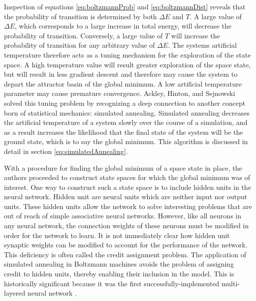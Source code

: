 \documentclass[11pt]{afthesis}
\begin{document}
	Inspection of equations \ref{eq:boltzmannProb} and \ref{eq:boltzmannDist} reveals that the probability of transition is determined by both \begin{math}\Delta E\end{math} and \begin{math}T\end{math}. A large value of \begin{math}\Delta E\end{math}, which corresponds to a large increase in total energy, will decrease the probability of transition. Conversely, a large value of \begin{math}T\end{math} will increase the probability of transition for any arbitrary value of \begin{math}\Delta E\end{math}. The systems artificial temperature therefore acts as a tuning mechanism for the exploration of the state space. A high temperature value will result greater exploration of the space state, but will result in less gradient descent and therefore may cause the system to depart the attractor basin of the global minimum. A low artificial temperature parameter may cause premature convergence. Ackley, Hinton, and Sejnowski solved this tuning problem by recognizing a deep connection to another concept born of statistical mechanics: simulated annealing. Simulated annealing decreases the artificial temperature of a system slowly over the course of a simulation, and as a result increases the likelihood that the final state of the system will be the ground state, which is to say the global minimum. This algorithm is discussed in detail in section \ref{eq:simulatedAnnealing}.
	
	With a procedure for finding the global minimum of a space state in place, the authors proceeded to construct state spaces for which the global minimum was of interest. One way to construct such a state space is to include hidden units in the neural network. Hidden unit are neural units which are neither input nor output units. These hidden units allow the network to solve interesting problems that are out of reach of simple associative neural networks\cite{anderson1988neurocomputing}. However, like all neurons in any neural network, the connection weights of these neurons must be modified in order for the network to learn. It is not immediately clear how hidden unit synaptic weights can be modified to account for the performance of the network. This deficiency is often called the credit assignment problem\cite{barto1983neuronlike}. The application of simulated annealing in Boltzmann machines avoids the problem of assigning credit to hidden units, thereby enabling their inclusion in the model. This is historically significant because it was the first successfully-implemented multi-layered neural network \cite{haykin1999}.
\end{document}
